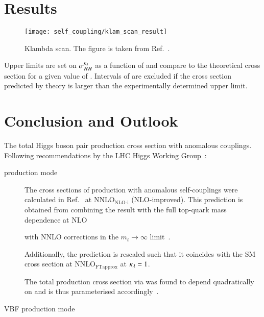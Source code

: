 \section{Results}%
\label{sec:reinterpretation_results}


\begin{figure}[htbp]
  \centering

  \texttt{[image: self\_coupling/klam\_scan\_result]}

  \caption{Klambda scan. The figure is taken from
    Ref.~\cite{ATLAS-CONF-2021-052}.}%
  \label{fig:klambda_scan}
\end{figure}

Upper limits are set on $\sigma_{HH}^{\kappa_{\lambda}}$ as a function of
\klambda and compare to the theoretical cross section for a given
value of \klambda. Intervals of \klambda are excluded if the cross
section predicted by theory is larger than the experimentally
determined upper limit.


\section{Conclusion and Outlook}%
\label{sec:reinterpretation_conclusion}


The total Higgs boson pair production cross section with anomalous
couplings. Following recommendations by the LHC Higgs Working
Group~\cite{LHCHWGHH}:
\begin{description}

\item[\ggF production mode] The cross sections of \HH production with
  anomalous self-couplings were calculated in
  Ref.~\cite{Amoroso:2020lgh} at $\text{NNLO}_{\text{NLO-i}}$
  (NLO-improved). This prediction is obtained from combining the
  result with the full top-quark mass dependence at
  NLO~\cite{Buchalla:2018yce}


  with NNLO corrections in the $m_{t} \to \infty$
  limit~\cite{deFlorian:2017qfk}.

  Additionally, the prediction is rescaled such that it coincides with
  the SM \HH cross section at $\text{NNLO}_{\text{FTapprox}}$ at
  $\kappa_{\lambda} = 1$.

  The total \HH production cross section via \ggF was found to depend
  quadratically on \klambda and is thus parameterised
  accordingly~\cite{LHCHWGHH}.

\item[VBF production mode]

\end{description}


